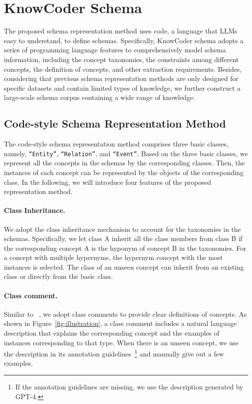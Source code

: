 \section{KnowCoder Schema} 
The proposed schema representation method uses code, a language that LLMs easy to understand, to define schemas. Specifically, KnowCoder schema adopts a series of programming language features to comprehensively model schema information, including the concept taxonomies, the constraints among different concepts, the definition of concepts, and other extraction requirements. Besides, considering that previous schema representation methods are only designed for specific datasets and contain limited types of knowledge, we further construct a
large-scale schema corpus containing a wide range of knowledge.

\subsection{Code-style Schema Representation Method}

 The code-style schema representation method comprises three basic classes,
 namely, \texttt{``\textcolor{darkgreen}{Entity}''}, \texttt{``\textcolor{darkgreen}{Relation}''}, and \texttt{``\textcolor{darkgreen}{Event}''}. Based on the three basic
 classes, we represent all the concepts in the schemas by the corresponding
 classes. Then, the instances of each concept can be represented by the objects
 of the corresponding class. In the following, we will introduce four features
 of the proposed representation method.

  \paragraph{Class Inheritance.} We adopt the class inheritance mechanism to
  account for the taxonomies in the schemas. Specifically, we let class A
  inherit all the class members from class B if the corresponding concept A is
  the hyponym of concept B in the taxonomies. For a concept with multiple
  hypernyms, the hypernym concept with the most instances is selected. The class
  of an unseen concept can inherit from an existing class or directly from the
  basic class.
  
  \paragraph{Class comment.} Similar to ~\citet{sainz2023gollie}, we adopt
  class comments to provide clear definitions of concepts. As shown in
  Figure~\ref{fig:illustration}, a class comment includes a natural language
  description that explains the corresponding concept and the examples of instances
  corresponding to that type. When there is an unseen concept, we use the
  description in its annotation guidelines~\footnote{If the annotation
  guidelines are missing, we use the description generated by GPT-4.} and
  manually give out a few examples. 

